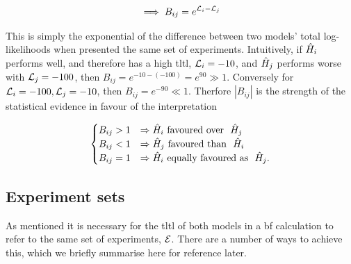\begin{equation}
    \label{eqn:bf_succinct}
    \implies B_{ij} = e^{{\mathcal{L}}_{i} - {\mathcal{L}}_{j}}    
\end{equation}


This is simply the exponential of the difference between two models' total log-likelihoods when presented the same set of experiments. 
Intuitively, if $\hat{H}_i$ performs well, and therefore has a high \gls{tltl}, ${\mathcal{L}}_{i}=-10$, 
    and $\hat{H}_j$ performs worse with ${\mathcal{L}}_{j}=-100$, then $B_{ij} = e^{-10-(-100)} = e^{90} \gg 1$.
Conversely for ${\mathcal{L}}_{i}=-100, {\mathcal{L}}_{j}=-10$, then $B_{ij} = e^{-90} \ll 1$. 
Therfore $\left| B_{ij} \right|$ is the strength of the statistical evidence
    in favour of the interpretation 

\begin{equation}
    \label{eqn:bf_cases}
    \begin{cases}
        B_{ij} > 1 & \Rightarrow \hat{H}_i \text{\ favoured over \ } \hat{H}_j \\
        B_{ij} < 1 & \Rightarrow \hat{H}_j \text{\ favoured than \ } \hat{H}_i \\
        B_{ij} = 1 & \Rightarrow \hat{H}_i \text{\ equally favoured as \ } \hat{H}_j. \\
    \end{cases}
\end{equation} 

\subsection{Experiment sets}\label{sec:experiments_for_bf}
As mentioned it is necessary for the \gls{tltl} of both models in a \gls{bf} calculation to
    refer to the same set of experiments, ${ \mathcal{E} }$. 
There are a number of ways to achieve this, 
    which we briefly summarise here for reference later. 
\par 

